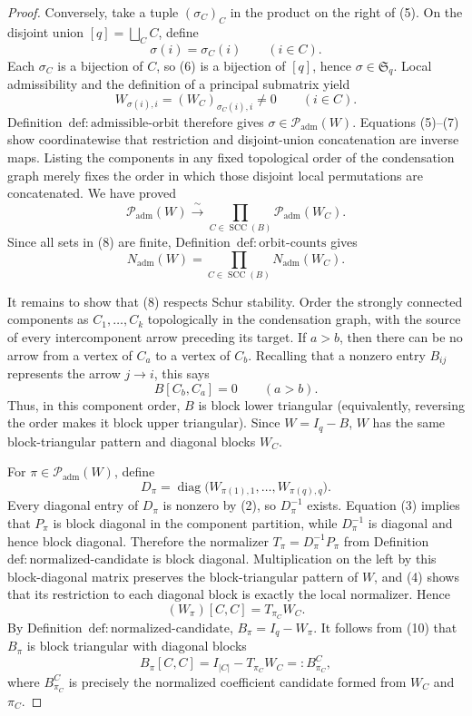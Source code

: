 \documentclass{article}
\begin{document}
\begin{proof}
Conversely, take a tuple \((\sigma_C)_C\) in the product on the right of (5).  On the disjoint union \([q]=\bigsqcup_C C\), define
\[
 \sigma(i)=\sigma_C(i)\qquad(i\in C). \tag{6}
\]
Each \(\sigma_C\) is a bijection of \(C\), so (6) is a bijection of \([q]\), hence \(\sigma\in\mathfrak S_q\).  Local admissibility and the definition of a principal submatrix yield
\[
 W_{\sigma(i),i}=(W_C)_{\sigma_C(i),i}\neq0
 \qquad(i\in C). \tag{7}
\]
Definition~\(\mathrm{def:admissible\text{-}orbit}\) therefore gives \(\sigma\in\mathcal P_{\mathrm{adm}}(W)\).  Equations (5)--(7) show coordinatewise that restriction and disjoint-union concatenation are inverse maps.  Listing the components in any fixed topological order of the condensation graph merely fixes the order in which those disjoint local permutations are concatenated.  We have proved
\[
 \mathcal P_{\mathrm{adm}}(W)
 \xrightarrow{\ \sim\ }
 \prod_{C\in\operatorname{SCC}(B)}
 \mathcal P_{\mathrm{adm}}(W_C). \tag{8}
\]
Since all sets in (8) are finite, Definition~\(\mathrm{def:orbit\text{-}counts}\) gives
\[
 N_{\mathrm{adm}}(W)
 =\prod_{C\in\operatorname{SCC}(B)}N_{\mathrm{adm}}(W_C). \tag{9}
\]

It remains to show that (8) respects Schur stability.  Order the strongly connected components as \(C_1,\ldots,C_k\) topologically in the condensation graph, with the source of every intercomponent arrow preceding its target.  If \(a>b\), then there can be no arrow from a vertex of \(C_a\) to a vertex of \(C_b\).  Recalling that a nonzero entry \(B_{ij}\) represents the arrow \(j\to i\), this says
\[
 B[C_b,C_a]=0\qquad(a>b).
\]
Thus, in this component order, \(B\) is block lower triangular (equivalently, reversing the order makes it block upper triangular).  Since \(W=I_q-B\), \(W\) has the same block-triangular pattern and diagonal blocks \(W_C\).

For \(\pi\in\mathcal P_{\mathrm{adm}}(W)\), define
\[
 D_\pi=\operatorname{diag}\bigl(W_{\pi(1),1},\ldots,
 W_{\pi(q),q}\bigr).
\]
Every diagonal entry of \(D_\pi\) is nonzero by (2), so \(D_\pi^{-1}\) exists.  Equation (3) implies that \(P_\pi\) is block diagonal in the component partition, while \(D_\pi^{-1}\) is diagonal and hence block diagonal.  Therefore the normalizer \(T_\pi=D_\pi^{-1}P_\pi\) from Definition~\(\mathrm{def:normalized\text{-}candidate}\) is block diagonal.  Multiplication on the left by this block-diagonal matrix preserves the block-triangular pattern of \(W\), and (4) shows that its restriction to each diagonal block is exactly the local normalizer.  Hence
\[
 (W_\pi)[C,C]=T_{\pi_C}W_C. \tag{10}
\]
By Definition~\(\mathrm{def:normalized\text{-}candidate}\), \(B_\pi=I_q-W_\pi\).  It follows from (10) that \(B_\pi\) is block triangular with diagonal blocks
\[
 B_\pi[C,C]
 =I_{|C|}-T_{\pi_C}W_C
 =:B^C_{\pi_C}, \tag{11}
\]
where \(B^C_{\pi_C}\) is precisely the normalized coefficient candidate formed from \(W_C\) and \(\pi_C\).


\end{proof}
\end{document}
